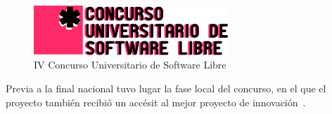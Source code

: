 \begin{figure}[h!]
  \centering
  \includegraphics[width=0.65\textwidth]{8_conclusiones/imagen_logocusl}
  \caption{IV Concurso Universitario de Software Libre}
\end{figure}

Previa a la final nacional tuvo lugar la fase local del concurso, en el que el
proyecto también recibió un accésit al mejor proyecto de
innovación~\cite{cusllocal}.
